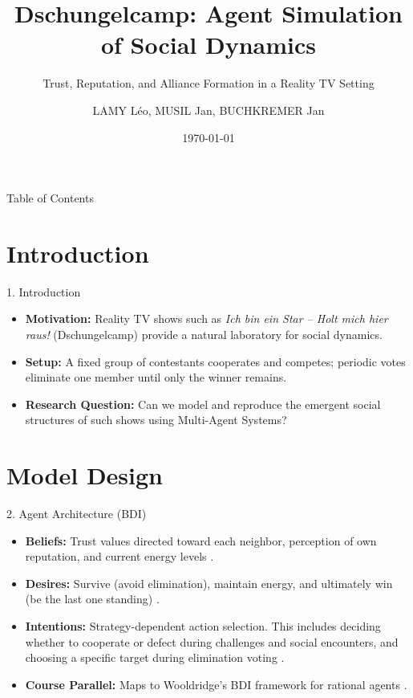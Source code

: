 \documentclass{beamer}
\title[Dschungelcamp Simulation]{Dschungelcamp: Agent Simulation of Social Dynamics}
\subtitle{Trust, Reputation, and Alliance Formation in a Reality TV Setting}
\author{LAMY Léo, MUSIL Jan, BUCHKREMER Jan}
\institute[UPM]{Graph Analysis and Social Networks (2025-26)}
\date{\today}
\begin{document}
\begin{frame}
    \titlepage
\end{frame}

\begin{frame}{Table of Contents}
    \tableofcontents
\end{frame}

\section{Introduction}

\begin{frame}{1. Introduction}
    \begin{itemize}
        \item \textbf{Motivation:} Reality TV shows such as \textit{Ich bin ein Star -- Holt mich hier raus!} (Dschungelcamp) provide a natural laboratory for social dynamics.
        \item \textbf{Setup:} A fixed group of contestants cooperates and competes; periodic votes eliminate one member until only the winner remains.
        \item \textbf{Research Question:} Can we model and reproduce the emergent social structures of such shows using Multi-Agent Systems?
    \end{itemize}
\end{frame}

\section{Model Design}

\begin{frame}{2. Agent Architecture (BDI)}
    \begin{itemize}
        \item \textbf{Beliefs:} Trust values directed toward each neighbor, perception of own reputation, and current energy levels \cite{Mui}.
        \item \textbf{Desires:} Survive (avoid elimination), maintain energy, and ultimately win (be the last one standing) \cite{Wooldridge}.
        \item \textbf{Intentions:} Strategy-dependent action selection. This includes deciding whether to cooperate or defect during challenges and social encounters, and choosing a specific target during elimination voting \cite{Wooldridge}.
        \item \textbf{Course Parallel:} Maps to Wooldridge's BDI framework for rational agents \cite{Wooldridge}.
    \end{itemize}
\end{frame}
\end{document}
